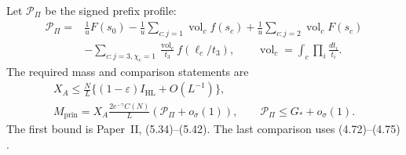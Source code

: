 Let $\mathcal P_\Pi$ be the signed prefix profile:
\begin{equation}\label{eq:l3-principal-profile}
\begin{aligned}
 \mathcal P_\Pi={}&\frac1uF(s_0)
 -\frac1u\sum_{c:j=1}\operatorname{vol}_c f(s_c)
 +\frac1u\sum_{c:j=2}\operatorname{vol}_c F(s_c)\\
 &-\sum_{c:j=3,\chi_c=1}\frac{\operatorname{vol}_c}{t_3}f(\ell_c/t_3),
 \qquad \operatorname{vol}_c=\int_c\prod_i\frac{dt_i}{t_i}.
\end{aligned}
\end{equation}
The required mass and comparison statements are
\begin{equation}\label{eq:l3-principal-estimates}
\begin{gathered}
 X_A\le\frac NL\{(1-\varepsilon)I_{\mathrm{HL}}+O(L^{-1})\},\\
 M_{\mathrm{prin}}=X_A\frac{2e^{-\gamma}C(N)}L
                            (\mathcal P_\Pi+o_\sigma(1)),\qquad
 \mathcal P_\Pi\le G_*+o_\sigma(1).
\end{gathered}
\end{equation}
The first bound is Paper~II, (5.34)--(5.42).
The last comparison uses (4.72)--(4.75)
\cite[(4.72)--(4.75), (5.34)--(5.42)]{PaperII}.
